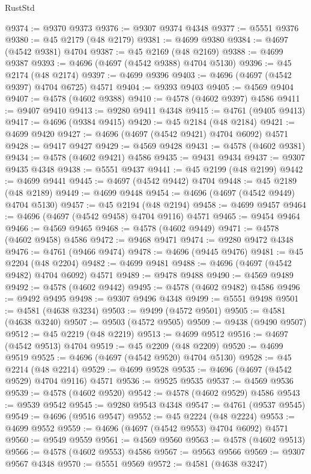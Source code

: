 \begin{lexlean}{RustStd}
\begin{coremodule}
@9374 := @9370 @9373
@9376 := @9307 @9374 @4348
@9377 := @5551 @9376
@9380 := @45 @2179 (@48 @2179)
@9381 := @4699 @9380
@9384 := @4697 (@4542 @9381) @4704
@9387 := @45 @2169 (@48 @2169)
@9388 := @4699 @9387
@9393 := @4696 (@4697 (@4542 @9388) @4704 @5130)
@9396 := @45 @2174 (@48 @2174)
@9397 := @4699 @9396
@9403 := @4696 (@4697 (@4542 @9397) @4704 @6725) @4571
@9404 := @9393 @9403
@9405 := @4569 @9404
@9407 := @4578 (@4602 @9388)
@9410 := @4578 (@4602 @9397) @4586
@9411 := @9407 @9410
@9413 := @9280 @9411 @4348
@9415 := @4761 (@9405 @9413)
@9417 := @4696 (@9384 @9415)
@9420 := @45 @2184 (@48 @2184)
@9421 := @4699 @9420
@9427 := @4696 (@4697 (@4542 @9421) @4704 @6092) @4571
@9428 := @9417 @9427
@9429 := @4569 @9428
@9431 := @4578 (@4602 @9381)
@9434 := @4578 (@4602 @9421) @4586
@9435 := @9431 @9434
@9437 := @9307 @9435 @4348
@9438 := @5551 @9437
@9441 := @45 @2199 (@48 @2199)
@9442 := @4699 @9441
@9445 := @4697 (@4542 @9442) @4704
@9448 := @45 @2189 (@48 @2189)
@9449 := @4699 @9448
@9454 := @4696 (@4697 (@4542 @9449) @4704 @5130)
@9457 := @45 @2194 (@48 @2194)
@9458 := @4699 @9457
@9464 := @4696 (@4697 (@4542 @9458) @4704 @9116) @4571
@9465 := @9454 @9464
@9466 := @4569 @9465
@9468 := @4578 (@4602 @9449)
@9471 := @4578 (@4602 @9458) @4586
@9472 := @9468 @9471
@9474 := @9280 @9472 @4348
@9476 := @4761 (@9466 @9474)
@9478 := @4696 (@9445 @9476)
@9481 := @45 @2204 (@48 @2204)
@9482 := @4699 @9481
@9488 := @4696 (@4697 (@4542 @9482) @4704 @6092) @4571
@9489 := @9478 @9488
@9490 := @4569 @9489
@9492 := @4578 (@4602 @9442)
@9495 := @4578 (@4602 @9482) @4586
@9496 := @9492 @9495
@9498 := @9307 @9496 @4348
@9499 := @5551 @9498
@9501 := @4581 (@4638 @3234)
@9503 := @9499 (@4572 @9501)
@9505 := @4581 (@4638 @3240)
@9507 := @9503 (@4572 @9505)
@9509 := @9438 (@9490 @9507)
@9512 := @45 @2219 (@48 @2219)
@9513 := @4699 @9512
@9516 := @4697 (@4542 @9513) @4704
@9519 := @45 @2209 (@48 @2209)
@9520 := @4699 @9519
@9525 := @4696 (@4697 (@4542 @9520) @4704 @5130)
@9528 := @45 @2214 (@48 @2214)
@9529 := @4699 @9528
@9535 := @4696 (@4697 (@4542 @9529) @4704 @9116) @4571
@9536 := @9525 @9535
@9537 := @4569 @9536
@9539 := @4578 (@4602 @9520)
@9542 := @4578 (@4602 @9529) @4586
@9543 := @9539 @9542
@9545 := @9280 @9543 @4348
@9547 := @4761 (@9537 @9545)
@9549 := @4696 (@9516 @9547)
@9552 := @45 @2224 (@48 @2224)
@9553 := @4699 @9552
@9559 := @4696 (@4697 (@4542 @9553) @4704 @6092) @4571
@9560 := @9549 @9559
@9561 := @4569 @9560
@9563 := @4578 (@4602 @9513)
@9566 := @4578 (@4602 @9553) @4586
@9567 := @9563 @9566
@9569 := @9307 @9567 @4348
@9570 := @5551 @9569
@9572 := @4581 (@4638 @3247)

\end{coremodule}
\end{lexlean}
